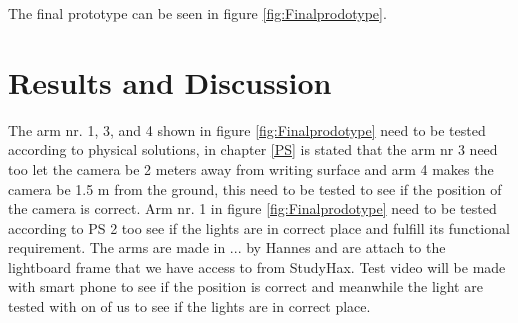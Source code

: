 \documentclass[a4paper]{jpconf}
\begin{document}
The final prototype can be seen in figure \ref{fig:Finalprodotype}.

\section{Results and Discussion}


The arm nr. 1, 3, and 4  shown in figure \ref{fig:Finalprodotype} need to be tested according to physical solutions, in chapter \ref{PS} is stated that the arm nr 3 need too let the camera be 2 meters away from writing surface and arm 4 makes the camera be 1.5 m from the ground, this need to be tested to see if the position of the camera is correct. Arm nr. 1  in figure \ref{fig:Finalprodotype} need to be tested according to PS 2 too see if the lights are in correct place and fulfill its functional requirement. 
The arms are made in ... by Hannes  and are attach  to the  lightboard frame that we have access to from StudyHax.  Test video will be made with smart phone to see if the position is correct and meanwhile the light are tested with on of us to see if the lights are in correct place.

\end{document}
